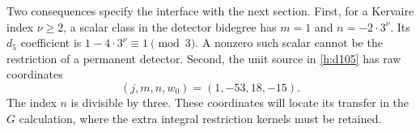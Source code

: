 Two consequences specify the interface with the next section.
First, for a Kervaire index $\nu\geq2$, a scalar class in the detector
bidegree has $m=1$ and $n=-2\cdot3^\nu$. Its $d_5$ coefficient is
$1-4\cdot3^\nu\equiv1\pmod3$. A nonzero such scalar cannot be the
restriction of a permanent detector. Second, the unit source in
\eqref{h:d105} has raw coordinates
\begin{equation}
 \label{h:unit-source-raw}
 (j,m,n,w_0)=(1,-53,18,-15).
\end{equation}
The index $n$ is divisible by three. These coordinates will locate
its transfer in the $G$ calculation, where the extra integral
restriction kernels must be retained.
